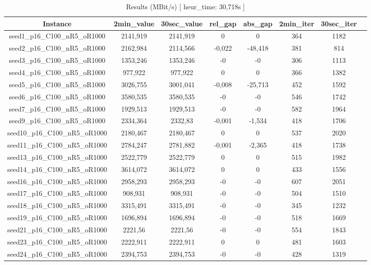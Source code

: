 \documentclass[a4paper]{article}
\begin{document}
\begin{center}
\begin{longtable}{cccccccc}
\caption{Results (MBit/s) [ heur\_time: 30,718s ]  }
\tabularnewline
\hline
Instance & 2min\_value & 30sec\_value & rel\_gap & abs\_gap & 2min\_iter & 30sec\_iter\\
\hline
seed1\_p16\_C100\_nR5\_oR1000 & 2141,919 & 2141,919 & 0 & 0 & 364 & 1182\\
\hline
seed2\_p16\_C100\_nR5\_oR1000 & 2162,984 & 2114,566 & -0,022 & -48,418 & 381 & 814\\
\hline
seed3\_p16\_C100\_nR5\_oR1000 & 1353,246 & 1353,246 & -0 & -0 & 306 & 1113\\
\hline
seed4\_p16\_C100\_nR5\_oR1000 & 977,922 & 977,922 & 0 & 0 & 366 & 1382\\
\hline
seed5\_p16\_C100\_nR5\_oR1000 & 3026,755 & 3001,041 & -0,008 & -25,713 & 452 & 1592\\
\hline
seed6\_p16\_C100\_nR5\_oR1000 & 3580,535 & 3580,535 & -0 & -0 & 546 & 1742\\
\hline
seed7\_p16\_C100\_nR5\_oR1000 & 1929,513 & 1929,513 & -0 & -0 & 582 & 1964\\
\hline
seed9\_p16\_C100\_nR5\_oR1000 & 2334,364 & 2332,83 & -0,001 & -1,534 & 418 & 1706\\
\hline
seed10\_p16\_C100\_nR5\_oR1000 & 2180,467 & 2180,467 & 0 & 0 & 537 & 2020\\
\hline
seed11\_p16\_C100\_nR5\_oR1000 & 2784,247 & 2781,882 & -0,001 & -2,365 & 418 & 1738\\
\hline
seed13\_p16\_C100\_nR5\_oR1000 & 2522,779 & 2522,779 & 0 & 0 & 515 & 1982\\
\hline
seed14\_p16\_C100\_nR5\_oR1000 & 3614,072 & 3614,072 & 0 & 0 & 433 & 1556\\
\hline
seed16\_p16\_C100\_nR5\_oR1000 & 2958,293 & 2958,293 & -0 & -0 & 607 & 2051\\
\hline
seed17\_p16\_C100\_nR5\_oR1000 & 908,931 & 908,931 & -0 & -0 & 504 & 1510\\
\hline
seed18\_p16\_C100\_nR5\_oR1000 & 3315,491 & 3315,491 & -0 & -0 & 345 & 1232\\
\hline
seed19\_p16\_C100\_nR5\_oR1000 & 1696,894 & 1696,894 & -0 & -0 & 518 & 1669\\
\hline
seed21\_p16\_C100\_nR5\_oR1000 & 2221,56 & 2221,56 & -0 & -0 & 554 & 1843\\
\hline
seed23\_p16\_C100\_nR5\_oR1000 & 2222,911 & 2222,911 & 0 & 0 & 481 & 1603\\
\hline
seed24\_p16\_C100\_nR5\_oR1000 & 2394,753 & 2394,753 & -0 & -0 & 428 & 1319\\

\end{longtable}
\end{center}
\end{document}
